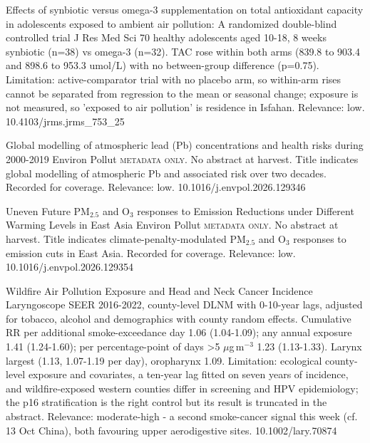\documentclass[10pt]{article}
\begin{document}
{Effects of synbiotic versus omega-3 supplementation on total antioxidant capacity in adolescents exposed to ambient air pollution: A randomized double-blind controlled trial}
{J Res Med Sci}
{70 healthy adolescents aged 10-18, 8 weeks synbiotic (n=38) vs omega-3 (n=32). TAC rose within both arms (839.8 to 903.4 and 898.6 to 953.3 umol/L) with no between-group difference (p=0.75). Limitation: active-comparator trial with no placebo arm, so within-arm rises cannot be separated from regression to the mean or seasonal change; exposure is not measured, so 'exposed to air pollution' is residence in Isfahan. Relevance: low.}
{10.4103/jrms.jrms_753_25}

{Global modelling of atmospheric lead (Pb) concentrations and health risks during 2000-2019}
{Environ Pollut}
{\textsc{metadata only.} No abstract at harvest. Title indicates global modelling of atmospheric Pb and associated risk over two decades. Recorded for coverage. Relevance: low.}
{10.1016/j.envpol.2026.129346}

{Uneven Future PM$_{2.5}$ and O$_3$ responses to Emission Reductions under Different Warming Levels in East Asia}
{Environ Pollut}
{\textsc{metadata only.} No abstract at harvest. Title indicates climate-penalty-modulated PM$_{2.5}$ and O$_3$ responses to emission cuts in East Asia. Recorded for coverage. Relevance: low.}
{10.1016/j.envpol.2026.129354}

\par{}\baselineskip{}\baselineskip
{}

{Wildfire Air Pollution Exposure and Head and Neck Cancer Incidence}
{Laryngoscope}
{SEER 2016-2022, county-level DLNM with 0-10-year lags, adjusted for tobacco, alcohol and demographics with county random effects. Cumulative RR per additional smoke-exceedance day 1.06 (1.04-1.09); any annual exposure 1.41 (1.24-1.60); per percentage-point of days >5 $\mu$g\,m$^{-3}$ 1.23 (1.13-1.33). Larynx largest (1.13, 1.07-1.19 per day), oropharynx 1.09. Limitation: ecological county-level exposure and covariates, a ten-year lag fitted on seven years of incidence, and wildfire-exposed western counties differ in screening and HPV epidemiology; the p16 stratification is the right control but its result is truncated in the abstract. Relevance: moderate-high - a second smoke-cancer signal this week (cf. 13 Oct China), both favouring upper aerodigestive sites.}
{10.1002/lary.70874}
\end{document}
